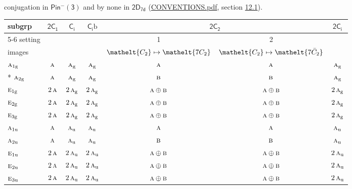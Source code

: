 \documentclass[10pt,a4paper]{article}
\numberwithin{equation}{section}
\newcommand{\eltfont}[1]{{\let\sigma\eltsigma\mathelt{#1}}}
\newcommand{\grp}[1]{\mathsf{#1}}
\newcommand{\irr}[1]{\text{\normalfont\scshape #1}}
\newcommand{\cls}[1]{\eltfont{#1}}
\newcommand{\ptag}[1]{\mathrm{#1}}
\newcommand{\barred}[1]{\bar{#1}}
\newcommand{\secondclass}{\mathrm{b}}
\begin{document}
conjugation in \href{Pinminus3.pdf}{$\grp{Pin^{-}(3)}$} and by none in $\grp{2D_{7d}}$ (\href{../../CONVENTIONS.pdf}{CONVENTIONS.pdf}, section \href{../../../rotation/CONVENTIONS.pdf\#conv.12.1}{12.1}).
{\small\begin{longtable}{@{}lcccccc@{}}\toprule
subgrp & \href{2C1.pdf}{$\grp{2C_{1}}$} & \href{S2.pdf}{$\grp{C_{i}}$} & \href{S2b.pdf}{$\grp{C_{i}}\secondclass$} & \multicolumn{2}{c}{\href{2C2.pdf}{$\grp{2C_{2}}$}} & \href{2S2.pdf}{$\grp{2C_{i}}$}\\\cmidrule(lr){5-6}
setting &  &  &  & 1 & 2 & \\
images &  &  &  & {\scriptsize $\cls{C_{2}} \mapsto \cls{7C_{2}}$} & {\scriptsize $\cls{C_{2}} \mapsto \cls{7\barred{C}_{2}}$} & \\\midrule\endhead
\bottomrule\endfoot\endlastfoot
$\irr{a}_{1\ptag{g}}$ & $\irr{a}$ & $\irr{a}_{\ptag{g}}$ & $\irr{a}_{\ptag{g}}$ & $\irr{a}$ & $\irr{a}$ & $\irr{a}_{\ptag{g}}$\\*
$\irr{a}_{2\ptag{g}}$ & $\irr{a}$ & $\irr{a}_{\ptag{g}}$ & $\irr{a}_{\ptag{g}}$ & $\irr{b}$ & $\irr{b}$ & $\irr{a}_{\ptag{g}}$\\
$\irr{e}_{1\ptag{g}}$ & $2\,\irr{a}$ & $2\,\irr{a}_{\ptag{g}}$ & $2\,\irr{a}_{\ptag{g}}$ & $\irr{a}\oplus \irr{b}$ & $\irr{a}\oplus \irr{b}$ & $2\,\irr{a}_{\ptag{g}}$\\
$\irr{e}_{2\ptag{g}}$ & $2\,\irr{a}$ & $2\,\irr{a}_{\ptag{g}}$ & $2\,\irr{a}_{\ptag{g}}$ & $\irr{a}\oplus \irr{b}$ & $\irr{a}\oplus \irr{b}$ & $2\,\irr{a}_{\ptag{g}}$\\
$\irr{e}_{3\ptag{g}}$ & $2\,\irr{a}$ & $2\,\irr{a}_{\ptag{g}}$ & $2\,\irr{a}_{\ptag{g}}$ & $\irr{a}\oplus \irr{b}$ & $\irr{a}\oplus \irr{b}$ & $2\,\irr{a}_{\ptag{g}}$\\
$\irr{a}_{1\ptag{u}}$ & $\irr{a}$ & $\irr{a}_{\ptag{u}}$ & $\irr{a}_{\ptag{u}}$ & $\irr{a}$ & $\irr{a}$ & $\irr{a}_{\ptag{u}}$\\
$\irr{a}_{2\ptag{u}}$ & $\irr{a}$ & $\irr{a}_{\ptag{u}}$ & $\irr{a}_{\ptag{u}}$ & $\irr{b}$ & $\irr{b}$ & $\irr{a}_{\ptag{u}}$\\
$\irr{e}_{1\ptag{u}}$ & $2\,\irr{a}$ & $2\,\irr{a}_{\ptag{u}}$ & $2\,\irr{a}_{\ptag{u}}$ & $\irr{a}\oplus \irr{b}$ & $\irr{a}\oplus \irr{b}$ & $2\,\irr{a}_{\ptag{u}}$\\
$\irr{e}_{2\ptag{u}}$ & $2\,\irr{a}$ & $2\,\irr{a}_{\ptag{u}}$ & $2\,\irr{a}_{\ptag{u}}$ & $\irr{a}\oplus \irr{b}$ & $\irr{a}\oplus \irr{b}$ & $2\,\irr{a}_{\ptag{u}}$\\
$\irr{e}_{3\ptag{u}}$ & $2\,\irr{a}$ & $2\,\irr{a}_{\ptag{u}}$ & $2\,\irr{a}_{\ptag{u}}$ & $\irr{a}\oplus \irr{b}$ & $\irr{a}\oplus \irr{b}$ & $2\,\irr{a}_{\ptag{u}}$\\

\end{longtable}}
\end{document}

